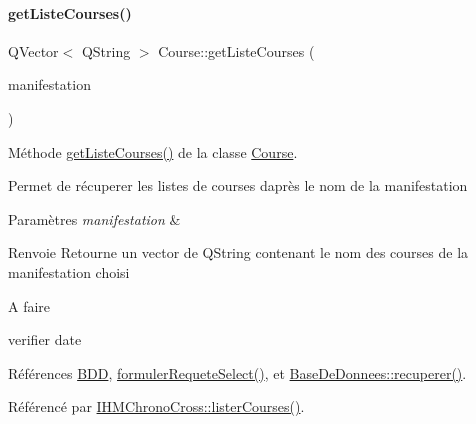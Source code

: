 \paragraph{\texorpdfstring{get\+Liste\+Courses()}{getListeCourses()}}
{\footnotesize\ttfamily Q\+Vector$<$ Q\+String $>$ Course\+::get\+Liste\+Courses (\begin{DoxyParamCaption}\item[{Q\+String}]{manifestation }\end{DoxyParamCaption})}



Méthode \hyperlink{class_course_ae5e74946d973166ad3000e38600acf20}{get\+Liste\+Courses()} de la classe \hyperlink{class_course}{Course}. 

Permet de récuperer les listes de courses d\textquotesingle{}après le nom de la manifestation 
\begin{DoxyParams}{Paramètres}
{\em manifestation} & \\
\hline
\end{DoxyParams}
\begin{DoxyReturn}{Renvoie}
Retourne un vector de Q\+String contenant le nom des courses de la manifestation choisi 
\end{DoxyReturn}
\begin{DoxyRefDesc}{A faire}
\item[\hyperlink{todo__todo000001}{A faire}]verifier date \end{DoxyRefDesc}


Références \hyperlink{class_course_a28a58b06494361b7a7eb81844d571dd4}{B\+DD}, \hyperlink{class_course_a2ce9c62ead2c878a30af9d9c11b81644}{formuler\+Requete\+Select()}, et \hyperlink{class_base_de_donnees_a77539baad389f5acf754cd2cd452403e}{Base\+De\+Donnees\+::recuperer()}.



Référencé par \hyperlink{class_i_h_m_chrono_cross_a1b9f117d7097b63ddabe168a5349a7e8}{I\+H\+M\+Chrono\+Cross\+::lister\+Courses()}.


